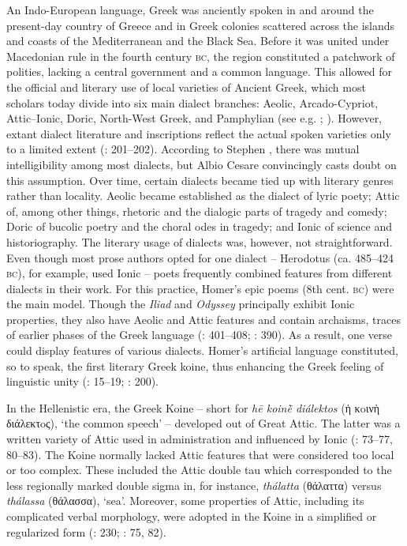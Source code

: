 An Indo-European language, Greek was anciently spoken in and around the present-day country of Greece and in Greek colonies scattered across the islands and coasts of the Mediterranean and the Black Sea. Before it was united under Macedonian rule in the fourth century \textsc{bc}, the region constituted a patchwork of polities, lacking a central government and a common language. This allowed for the official and literary use of local varieties of Ancient Greek, which most scholars today divide into six main dialect branches: Aeolic, Arcado-Cypriot, Attic–Ionic, Doric, North-West Greek, and Pamphylian (see e.g. \citealt{Colvin2010}; \citealt{Finkelberg2014}). However, extant dialect literature and inscriptions reflect the actual spoken varieties only to a limited extent (\citealt{Colvin2010}: 201–202). According to Stephen \citet[300, 303]{Colvin1999}, there was mutual intelligibility among most dialects, but Albio Cesare \citet[4--5]{Cassio2016} convincingly casts doubt on this assumption. Over time, certain dialects became tied up with literary genres rather than locality. Aeolic became established as the dialect of lyric poety; Attic of, among other things, rhetoric and the dialogic parts of tragedy and comedy; Doric of bucolic poetry and the choral odes in tragedy; and Ionic of science and historiography. The literary usage of dialects was, however, not straightforward. Even though most prose authors opted for one dialect – Herodotus (ca. 485–424 \textsc{bc}), for example, used Ionic – poets frequently combined features from different dialects in their work. For this practice, Homer’s epic poems (8th cent. \textsc{bc}) were the main model. Though the \textit{Iliad} and \textit{Odyssey} principally exhibit Ionic properties, they also have Aeolic and Attic features and contain archaisms, traces of earlier phases of the Greek language (\citealt{Hackstein2010}: 401–408; \citealt{Tribulato2010}: 390). As a result, one verse could display features of various dialects. Homer’s artificial language constituted, so to speak, the first literary Greek koine, thus enhancing the Greek feeling of linguistic unity (\citealt{Morpurgo1987}: 15–19; \citealt{Colvin2010}: 200).

In the Hellenistic era, the Greek Koine – short for \textit{hē koinḕ diálektos} (ἡ κoινὴ διάλεκτoς), ‘the common speech’ – developed out of Great Attic. The latter was a written variety of Attic used in administration and influenced by Ionic (\citealt{Horrocks2010}: 73–77, 80–83). The Koine normally lacked Attic features that were considered too local or too complex. These included the Attic double tau which corresponded to the less regionally marked double sigma in, for instance, \textit{thálatta} (θάλαττα) versus \textit{thálassa} (θάλασσα), ‘sea’. Moreover, some properties of Attic, including its complicated verbal morphology, were adopted in the Koine in a simplified or regularized form (\citealt{Brixhe2010}: 230; \citealt{Horrocks2010}: 75, 82).

